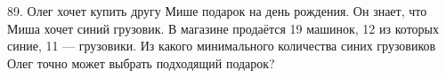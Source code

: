89. Олег хочет купить другу Мише подарок на день рождения. Он знает, что Миша хочет синий грузовик. В магазине продаётся 19 машинок, 12 из которых синие, 11 --- грузовики. Из какого минимального количества синих грузовиков Олег точно может выбрать подходящий подарок?\\

